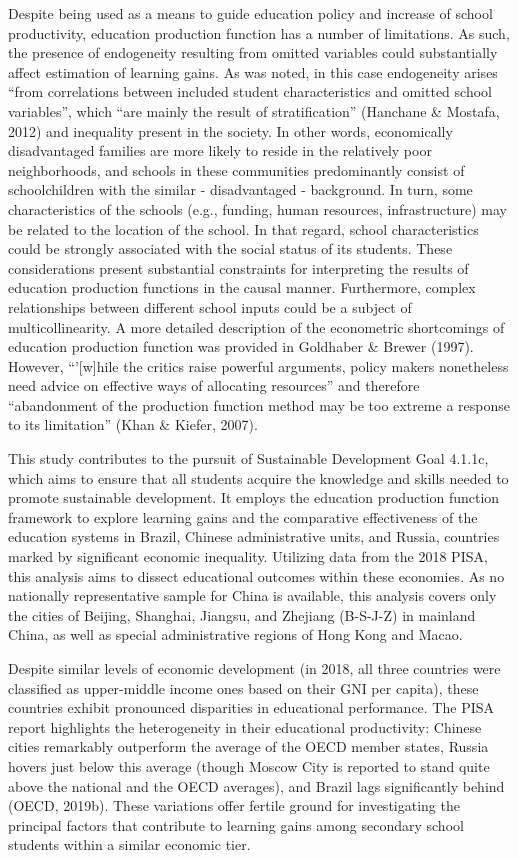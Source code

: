 \documentclass[
]{article}
\begin{document}
Despite being used as a means to guide education policy and increase of
school productivity, education production function has a number of
limitations. As such, the presence of endogeneity resulting from omitted
variables could substantially affect estimation of learning gains. As
was noted, in this case endogeneity arises ``from correlations between
included student characteristics and omitted school variables'', which
``are mainly the result of stratification'' (Hanchane \& Mostafa, 2012)
and inequality present in the society. In other words, economically
disadvantaged families are more likely to reside in the relatively poor
neighborhoods, and schools in these communities predominantly consist of
schoolchildren with the similar - disadvantaged - background. In turn,
some characteristics of the schools (e.g., funding, human resources,
infrastructure) may be related to the location of the school. In that
regard, school characteristics could be strongly associated with the
social status of its students. These considerations present substantial
constraints for interpreting the results of education production
functions in the causal manner. Furthermore, complex relationships
between different school inputs could be a subject of multicollinearity.
A more detailed description of the econometric shortcomings of education
production function was provided in Goldhaber \& Brewer (1997). However,
``'{[}w{]}hile the critics raise powerful arguments, policy makers
nonetheless need advice on effective ways of allocating resources'' and
therefore ``abandonment of the production function method may be too
extreme a response to its limitation'' (Khan \& Kiefer, 2007).

This study contributes to the pursuit of Sustainable Development Goal
4.1.1c, which aims to ensure that all students acquire the knowledge and
skills needed to promote sustainable development. It employs the
education production function framework to explore learning gains and
the comparative effectiveness of the education systems in Brazil,
Chinese administrative units, and Russia, countries marked by
significant economic inequality. Utilizing data from the 2018 PISA, this
analysis aims to dissect educational outcomes within these economies. As
no nationally representative sample for China is available, this
analysis covers only the cities of Beijing, Shanghai, Jiangsu, and
Zhejiang (B-S-J-Z) in mainland China, as well as special administrative
regions of Hong Kong and Macao.

Despite similar levels of economic development (in 2018, all three
countries were classified as upper-middle income ones based on their GNI
per capita), these countries exhibit pronounced disparities in
educational performance. The PISA report highlights the heterogeneity in
their educational productivity: Chinese cities remarkably outperform the
average of the OECD member states, Russia hovers just below this average
(though Moscow City is reported to stand quite above the national and
the OECD averages), and Brazil lags significantly behind (OECD, 2019b).
These variations offer fertile ground for investigating the principal
factors that contribute to learning gains among secondary school
students within a similar economic tier.
\end{document}
